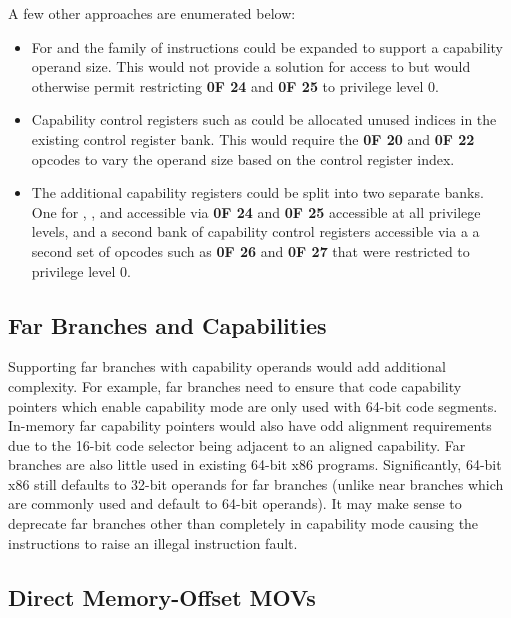 A few other approaches are enumerated below:

\begin{itemize}
  \item For \CFS{} and \CGS{} the  family of
    instructions could be expanded to support a capability operand
    size.  This would not provide a solution for access to \DDC{} but
    would otherwise permit restricting \textbf{0F 24} and \textbf{0F
      25} to privilege level 0.

  \item Capability control registers such as \KGS{} could be allocated
    unused indices in the existing control register bank.  This would
    require the \textbf{0F 20} and \textbf{0F 22} opcodes to vary the
    operand size based on the control register index.

  \item The additional capability registers could be split into two
    separate banks.  One for \CFS{}, \CGS{}, and \DDC{} accessible via
    \textbf{0F 24} and \textbf{0F 25} accessible at all privilege
    levels, and a second bank of capability control registers
    accessible via a a second set of opcodes such as \textbf{0F 26}
    and \textbf{0F 27} that were restricted to privilege level 0.
\end{itemize}

\subsection{Far Branches and Capabilities}

Supporting far branches with capability operands would add additional
complexity.  For example, far branches need to ensure that code
capability pointers which enable capability mode are only used with
64-bit code segments.  In-memory far capability pointers would also
have odd alignment requirements due to the 16-bit code selector being
adjacent to an aligned capability.  Far branches are also little used
in existing 64-bit x86 programs.  Significantly, 64-bit x86 still
defaults to 32-bit operands for far branches (unlike near branches
which are commonly used and default to 64-bit operands).  It may make
sense to deprecate far branches other than  completely
in capability mode causing the instructions to raise an illegal
instruction fault.

\subsection{Direct Memory-Offset MOVs}

